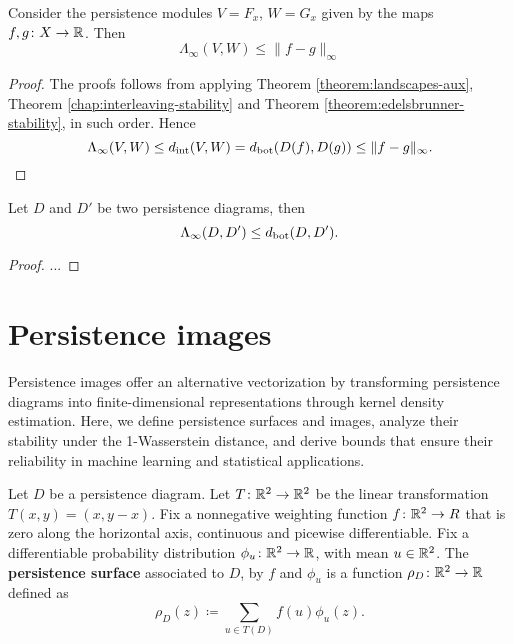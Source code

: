 \begin{theorem}
    Consider the persistence modules $ V = F_x $, $ W = G_x $ given by the maps $ f, g \colon X \to \mathbb R $. Then
    \begin{equation}
        \Lambda_\infty(V, W) \leq \| f - g\|_\infty
    \end{equation}
\end{theorem}
\begin{proof}
    The proofs follows from applying Theorem \ref{theorem:landscapes-aux}, Theorem \ref{chap:interleaving-stability} and Theorem \ref{theorem:edelsbrunner-stability}, in such order. Hence
    \begin{equation}
        \Lambda_\infty(V, W) \leq d_{\operatorname{int}}(V, W) = d_{\operatorname{bot}}(D(f), D(g)) \leq \| f - g\|_\infty.
    \end{equation}
\end{proof}

\begin{theorem}
    Let $ D $ and $ D' $ be two persistence diagrams, then
    \begin{equation}
        \Lambda_\infty(D, D') \leq d_{\operatorname{bot}}(D, D').
    \end{equation}
\end{theorem}
\begin{proof}
    ...
\end{proof}

\section{Persistence images} \label{sec:images}

Persistence images offer an alternative vectorization by transforming persistence diagrams into finite-dimensional representations through kernel density estimation. Here, we define persistence surfaces and images, analyze their stability under the 1-Wasserstein distance, and derive bounds that ensure their reliability in machine learning and statistical applications.

\begin{definition}
    Let $ D $ be a persistence diagram. Let $ T \colon \mathbb R^2 \to \mathbb R^2 $ be the linear transformation $ T(x, y) = (x, y-x) $. Fix a nonnegative weighting function $ f \colon \mathbb R^2 \to R $ that is zero along the horizontal axis, continuous and picewise differentiable. Fix a differentiable probability distribution $ \phi_u \colon \mathbb R^2 \to \mathbb R $, with mean $ u \in \mathbb R^2 $. The {\bf persistence surface} associated to $ D $, by $ f $ and $ \phi_u $ is a function $ \rho_D \colon \mathbb R^2 \to \mathbb R $ defined as
    \begin{equation}
        \rho_D(z) \coloneq \sum_{u \in T(D)} f(u) \phi_u(z).
    \end{equation}
\end{definition}

